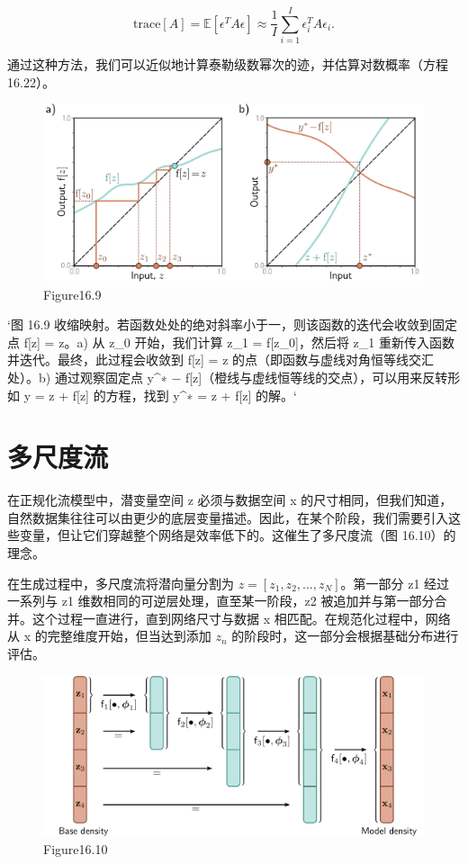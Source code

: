 \[
\text{trace}[A] = \mathbb{E} [\epsilon^T A \epsilon] \approx \frac{1}{I} \sum_{i=1}^I \epsilon_i^T A \epsilon_i. \tag{16.24}
\]

通过这种方法，我们可以近似地计算泰勒级数幂次的迹，并估算对数概率（方程 16.22）。

\begin{figure}[h!]
\centering
\includegraphics[width=0.7\linewidth]{png/chapter16/FlowBanach.png}
\caption{Figure16.9}
\end{figure}

`图 16.9 收缩映射。若函数处处的绝对斜率小于一，则该函数的迭代会收敛到固定点 f[z] = z。a) 从 z_0 开始，我们计算 z_1 = f[z_0]，然后将 z_1 重新传入函数并迭代。最终，此过程会收敛到 f[z] = z 的点（即函数与虚线对角恒等线交汇处）。b) 通过观察固定点 y^∗ − f[z]（橙线与虚线恒等线的交点），可以用来反转形如 y = z + f[z] 的方程，找到 y^∗ = z + f[z] 的解。`

\section{多尺度流}
在正规化流模型中，潜变量空间 z 必须与数据空间 x 的尺寸相同，但我们知道，自然数据集往往可以由更少的底层变量描述。因此，在某个阶段，我们需要引入这些变量，但让它们穿越整个网络是效率低下的。这催生了多尺度流（图 16.10）的理念。

在生成过程中，多尺度流将潜向量分割为 \(z = [z_1,z_2,...,z_N]\)。第一部分 z1 经过一系列与 z1 维数相同的可逆层处理，直至某一阶段，z2 被追加并与第一部分合并。这个过程一直进行，直到网络尺寸与数据 x 相匹配。在规范化过程中，网络从 x 的完整维度开始，但当达到添加 \(z_n\) 的阶段时，这一部分会根据基础分布进行评估。

\begin{figure}[h!]
\centering
\includegraphics[width=0.7\linewidth]{png/chapter16/FlowMultiscale.png}
\caption{Figure16.10}
\end{figure}

